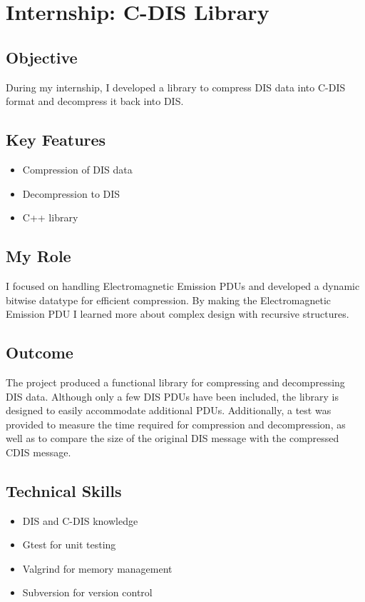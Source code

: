 \documentclass{article}
\begin{document}
\section{Internship: C-DIS Library}
\subsection{Objective}
During my internship, I developed a library to compress DIS data into C-DIS format and decompress it back into DIS.

\subsection{Key Features}
\begin{itemize}
    \item Compression of DIS data
    \item Decompression to DIS
    \item C++ library
\end{itemize}

\subsection{My Role}
I focused on handling Electromagnetic Emission PDUs and developed a dynamic bitwise datatype for efficient compression.
By making the Electromagnetic Emission PDU I learned more about complex design with recursive structures.

\subsection{Outcome}
The project produced a functional library for compressing and decompressing DIS data. Although only a few DIS PDUs have been included, the library is designed to easily accommodate additional PDUs. Additionally, a test was provided to measure the time required for compression and decompression, as well as to compare the size of the original DIS message with the compressed CDIS message.
\subsection{Technical Skills}
\begin{itemize}
    \item DIS and C-DIS knowledge
    \item Gtest for unit testing
    \item Valgrind for memory management
    \item Subversion for version control
\end{itemize}
\end{document}
